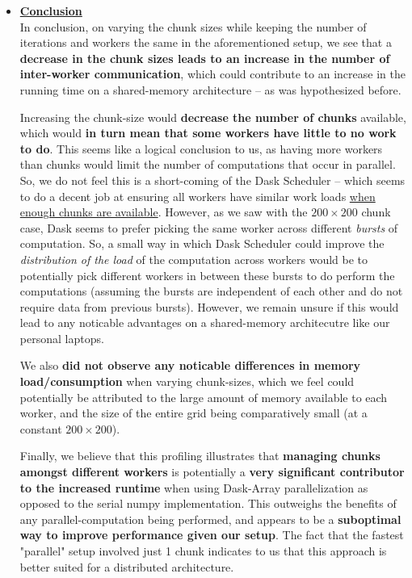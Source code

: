 \documentclass[a4paper,12pt]{article}
\begin{document}
\begin{itemize}
\item \textbf{\underline{Conclusion}}\\
In conclusion, on varying the chunk sizes while keeping the number of iterations and workers the same in the aforementioned setup, we see that a \textbf{decrease in the chunk sizes leads to an increase in the number of inter-worker communication}, which could contribute to an increase in the running time on a shared-memory architecture -- as was hypothesized before. 

Increasing the chunk-size would \textbf{decrease the number of chunks} available, which would \textbf{in turn mean that some workers have little to no work to do}. This seems like a logical conclusion to us, as having more workers than chunks would limit the number of computations that occur in parallel. So, we do not feel this is a short-coming of the Dask Scheduler -- which seems to do a decent job at ensuring all workers have similar work loads \underline{when enough chunks are available}. However, as we saw with the $200 \times 200$ chunk case, Dask seems to prefer picking the same worker across different \textit{bursts} of computation. So, a small way in which Dask Scheduler could improve the \textit{distribution of the load} of the computation across workers would be to potentially pick different workers in between these bursts to do perform the computations (assuming the bursts are independent of each other and do not require data from previous bursts). However, we remain unsure if this would lead to any noticable advantages on a shared-memory architecutre like our personal laptops.

We also \textbf{did not observe any noticable differences in memory load/consumption} when varying chunk-sizes, which we feel could potentially be attributed to the large amount of memory available to each worker, and the size of the entire grid being comparatively small (at a constant $200 \times 200$). 

Finally, we believe that this profiling illustrates that \textbf{managing chunks amongst different workers} is potentially a \textbf{very significant contributor to the increased runtime} when using Dask-Array parallelization as opposed to the serial numpy implementation. This outweighs the benefits of any parallel-computation being performed, and appears to be a \textbf{suboptimal way to improve performance given our setup}. The fact that the fastest "parallel" setup involved just 1 chunk indicates to us that this approach is better suited for a distributed architecture. 
\end{itemize}
\end{document}
